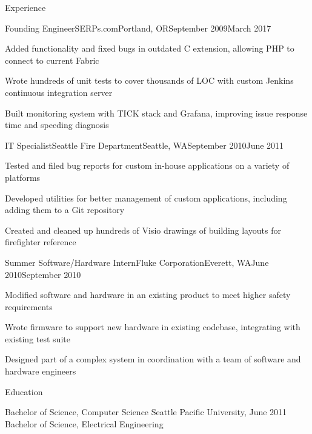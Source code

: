 \documentclass[letterpaper,10pt]{article}
\begin{document}
\begin{res_section}{Experience}
\begin{res_experienceitem}{Founding Engineer}{SERPs.com}{Portland, OR}{September 2009}{March 2017}
  \item Added functionality and fixed bugs in outdated C extension, allowing PHP to connect to current Fabric
  \item Wrote hundreds of unit tests to cover thousands of LOC with custom Jenkins continuous integration server
  \item Built monitoring system with TICK stack and Grafana, improving issue response time and speeding diagnosis
\end{res_experienceitem}
\begin{res_experienceitem}{IT Specialist}{Seattle Fire Department}{Seattle, WA}{September 2010}{June 2011}
  \item Tested and filed bug reports for custom in-house applications on a variety of platforms
  \item Developed utilities for better management of custom applications, including adding them to a Git repository
  \item Created and cleaned up hundreds of Visio drawings of building layouts for firefighter reference
\end{res_experienceitem}
\begin{res_experienceitem}{Summer Software/Hardware Intern}{Fluke Corporation}{Everett, WA}{June 2010}{September 2010}
  \item Modified software and hardware in an existing product to meet higher safety requirements
  \item Wrote firmware to support new hardware in existing codebase, integrating with existing test suite
  \item Designed part of a complex system in coordination with a team of software and hardware engineers
\end{res_experienceitem}
\end{res_section}

\begin{res_section}{Education}
\begin{res_content}{Bachelor of Science, Computer Science
  \textnormal{
      \sffamily
      \normalsize
      \hfill
      Seattle Pacific University, June 2011}\\
  Bachelor of Science, Electrical Engineering
}
\end{res_content}
\end{res_section}
\end{document}

